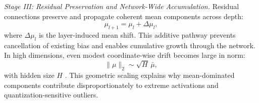 \noindent \emph{Stage III: Residual Preservation and Network-Wide Accumulation.}
Residual connections preserve and propagate coherent mean components across depth:
\begin{equation}
\mu_{l+1}=\mu_l+\Delta\mu_l,
\label{eq:residual_accumulation}
\end{equation}
where $\Delta\mu_l$ is the layer-induced mean shift. This additive pathway prevents cancellation of existing bias and enables cumulative growth through the network. In high dimensions, even modest coordinate-wise drift becomes large in norm:
\begin{equation}
\|\mu\|_2 \sim \sqrt{H}\,\bar{\mu},
\label{eq:mean_scaling}
\end{equation}
with hidden size $H$ \cite{tropp2012user,halko2011randomized}. This geometric scaling explains why mean-dominated components contribute disproportionately to extreme activations and quantization-sensitive outliers.
